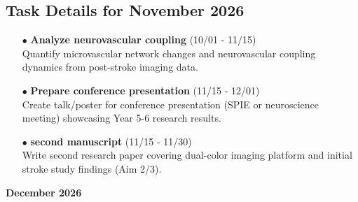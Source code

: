 \documentclass[landscape,a4paper]{article}
\begin{document}
\subsection{Task Details for November 2026}
\begin{itemize}[leftmargin=1cm]
    \item[\textcolor{other}{$\bullet$}] \textbf{Analyze neurovascular coupling} (10/01 - 11/15)\\ Quantify microvascular network changes and neurovascular coupling dynamics from post-stroke imaging data.
    \item[\textcolor{researchout}{$\bullet$}] \textbf{Prepare conference presentation} (11/15 - 12/01)\\ Create talk/poster for conference presentation (SPIE or neuroscience meeting) showcasing Year 5-6 research results.
    \item[\textcolor{researchout}{$\bullet$}] \textbf{second manuscript} (11/15 - 11/30)\\ Write second research paper covering dual-color imaging platform and initial stroke study findings (Aim 2/3).
\end{itemize}

\newpage
\pagestyle{empty}

\begin{center}
{\large\textbf{December 2026}}
\end{center}

\vspace{0.5cm}
\end{document}
